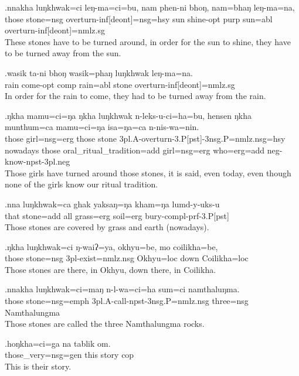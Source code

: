 \exg.nnakha luŋkhwak=ci  leŋ-ma=ci=bu, nam phen-ni bhoŋ, nam=bhaŋ leŋ-ma=na,\\
those  stone{\sc =nsg} overturn{\sc -inf[deont]=nsg=hsy} sun shine{\sc -opt} purp sun{\sc =abl} overturn{\sc -inf[deont]=nmlz.sg}\\
These stones have to be turned around, in order for the sun to shine, they have to be turned away from the sun.

\exg.wasik ta-ni  bhoŋ wasik=phaŋ luŋkhwak leŋ-ma=na.\\
rain  come{\sc -opt} comp  rain{\sc =abl} stone overturn{\sc -inf[deont]=nmlz.sg}\\
In order for the rain to come, they had to be turned away from the rain.

\exg.ŋkha mamu=ci=ŋa  ŋkha luŋkhwak n-leks-u-ci=ha=bu, hensen ŋkha munthum=ca  mamu=ci=ŋa  isa=ŋa=ca  n-nis-wa=nin.\\
those girl{\sc =nsg=erg} those stone {\sc 3pl.A-}overturn{\sc -3.P[pst]-3nsg.P=nmlz.nsg=hsy} nowadays those oral\_ritual\_tradition{\sc =add} {\sc girl=nsg=erg} who{\sc =erg=add} {\sc neg-}know{\sc -npst-3pl.neg}\\
Those girls have turned around those stones, it is said, even today, even though none of the girls know our ritual tradition.

\exg.nna  luŋkhwak=ca  ghak yaksaŋ=ŋa kham=ŋa lumd-y-uks-u\\
that stone{\sc =add} all  grass{\sc =erg} soil{\sc =erg} bury{\sc -compl-prf-3.P[pst]}\\
Those stones are covered by grass and earth (nowadays).

\exg.ŋkha luŋkhwak=ci  ŋ-waiʔ=ya,   okhyu=be, mo coilikha=be,\\
those stone{\sc =nsg} {\sc 3pl-}exist{\sc =nmlz.nsg} Okhyu{\sc =loc} down Coilikha{\sc =loc}\\
Those stones are there, in Okhyu, down there, in Coilikha.

\exg.nnakha luŋkhwak=ci=maŋ  n-l-wa=ci=ha    sum=ci namthaluŋma.\\
those  stone{\sc =nsg=emph} {\sc 3pl.A-}call{\sc -npst-3nsg.P=nmlz.nsg} three{\sc =nsg} Namthalungma\\
Those stones are called the three Namthalungma rocks.

\exg.hoŋkha=ci=ga  na tablik om.\\
those\_very{\sc =nsg=gen} this story  {\sc cop}\\
This is their story.


